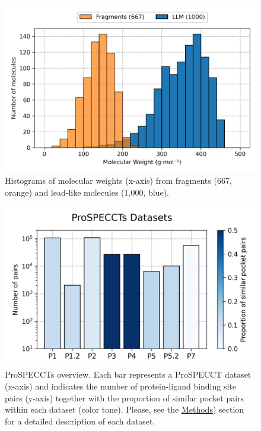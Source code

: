\begin{figure}[htbp]
  \centering
  \includegraphics[width=0.65\linewidth]{figures/PocketVec/Supplementary/FigS2.png}
  \caption{
  Histograms of molecular weights (x-axis) from fragments (667, orange) and lead-like molecules (1,000, blue).
  }
  \label{PocketVec_FigS2}
\end{figure}


\begin{figure}[htbp]
  \centering
  \includegraphics[width=0.75\linewidth]{figures/PocketVec/Supplementary/FigS3.png}
  \caption{
  ProSPECCTs overview. Each bar represents a ProSPECCT dataset (x-axis) and indicates the number of protein-ligand binding site pairs (y-axis) together with the proportion of similar pocket pairs within each dataset (color tone). Please, see the \hyperref[PocketVec_Methods]{Methods}) section for a detailed description of each dataset.
  }
  \label{PocketVec_FigS3}
\end{figure}


